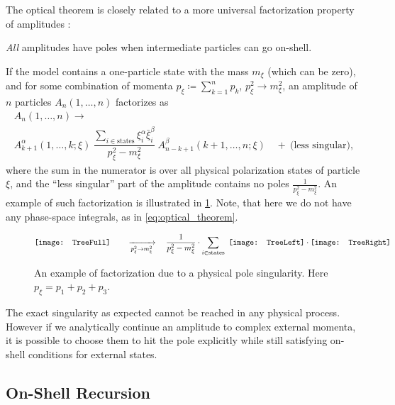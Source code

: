 The optical theorem is closely related to
a more universal factorization property of amplitudes \cite{Weinberg:1995mt}:
\begin{mdframed}
  \centering
  \emph{All} amplitudes have poles when intermediate particles can go on-shell.
\end{mdframed}
If the model contains a one-particle state with the mass $m_\xi$ (which can be zero),
and for some combination of momenta $p_\xi \coloneqq  \sum_{k=1}^{n} p_k$, $p_\xi^2 \to m_\xi^2$,
an amplitude of $n$ particles $A_n(1,\ldots{},n)$ factorizes as
\begin{multline} \label{eq:factorization_pole}
  A_n(1,\ldots{},n) \longrightarrow \\
    A^\alpha_{k+1}(1,\ldots{},k;\xi) ~
    \dfrac{\sum_{i \in \text{states}} \xi^\alpha_i \bar\xi^\beta_i }{p_\xi^2-m_\xi^2}~ A^\beta_{n-k+1}(k+1,\ldots{},n;\xi) \quad+~ \text{(less singular)},
\end{multline}
where the sum in the numerator is over all physical polarization states of particle $\xi$, 
and the ``less singular'' part of the amplitude contains no poles $\frac{1}{p_\xi^2-m_\xi^2}$.
An example of such factorization is illustrated in \cref{fig:factorization}.
Note, that here we do not have any phase-space integrals, as in \cref{eq:optical_theorem}. 

\begin{figure}[ht]
  \setlength{\figureheight}{0.11\textheight}
  \centering
  \begin{equation*}
    \vcenter{\hbox{\texttt{[image: TreeFull]}}} 
    \qquad \xrightarrow[p^2_\xi \to m_\xi^2]{} \quad
    \frac{1}{p^2_\xi - m_\xi^2} \cdot
    \sum_{i\in \text{states}}^{} ~
    \vcenter{\hbox{\texttt{[image: TreeLeft]}}}\cdot
    \vcenter{\hbox{\texttt{[image: TreeRight]}}}
  \end{equation*}
  \caption{
    An example of factorization due to a physical pole singularity. 
    Here $p_\xi =  p_1 + p_2 + p_3$.
  }
  \label{fig:factorization}
\end{figure}


The exact singularity as expected cannot be reached in any physical process.
However if we analytically continue an amplitude to complex external momenta,
it is possible to choose them to hit the pole explicitly
while still satisfying on-shell conditions for external states.


\subsection{On-Shell Recursion}
\label{sec:BCFW}

